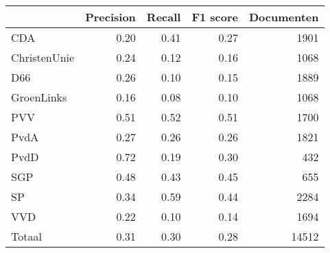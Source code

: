 \begin{tabular}{lrrrr}
\toprule
{} &  Precision &  Recall &  F1 score &  Documenten \\
\midrule
CDA          &       0.20 &    0.41 &      0.27 &        1901 \\
ChristenUnie &       0.24 &    0.12 &      0.16 &        1068 \\
D66          &       0.26 &    0.10 &      0.15 &        1889 \\
GroenLinks   &       0.16 &    0.08 &      0.10 &        1068 \\
PVV          &       0.51 &    0.52 &      0.51 &        1700 \\
PvdA         &       0.27 &    0.26 &      0.26 &        1821 \\
PvdD         &       0.72 &    0.19 &      0.30 &         432 \\
SGP          &       0.48 &    0.43 &      0.45 &         655 \\
SP           &       0.34 &    0.59 &      0.44 &        2284 \\
VVD          &       0.22 &    0.10 &      0.14 &        1694 \\
Totaal       &       0.31 &    0.30 &      0.28 &       14512 \\
\bottomrule
\end{tabular}
